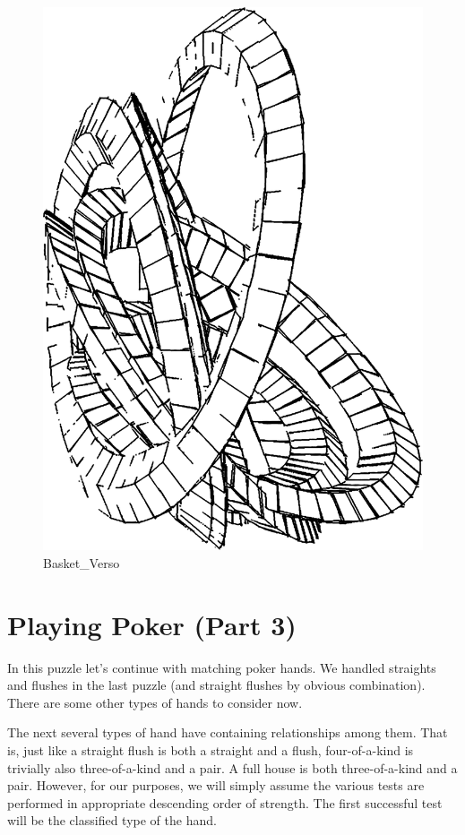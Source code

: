 \begin{figure}
\centering
\includegraphics{images/Basket_Verso.png}
\caption{Basket\_Verso}
\end{figure}

\newpage

\hypertarget{playing-poker-part-3}{%
\section{Playing Poker (Part 3)}\label{playing-poker-part-3}}

In this puzzle let's continue with matching poker hands. We handled
straights and flushes in the last puzzle (and straight flushes by
obvious combination). There are some other types of hands to consider
now.

The next several types of hand have containing relationships among them.
That is, just like a straight flush is both a straight and a flush,
four-of-a-kind is trivially also three-of-a-kind and a pair. A full
house is both three-of-a-kind and a pair. However, for our purposes, we
will simply assume the various tests are performed in appropriate
descending order of strength. The first successful test will be the
classified type of the hand.

